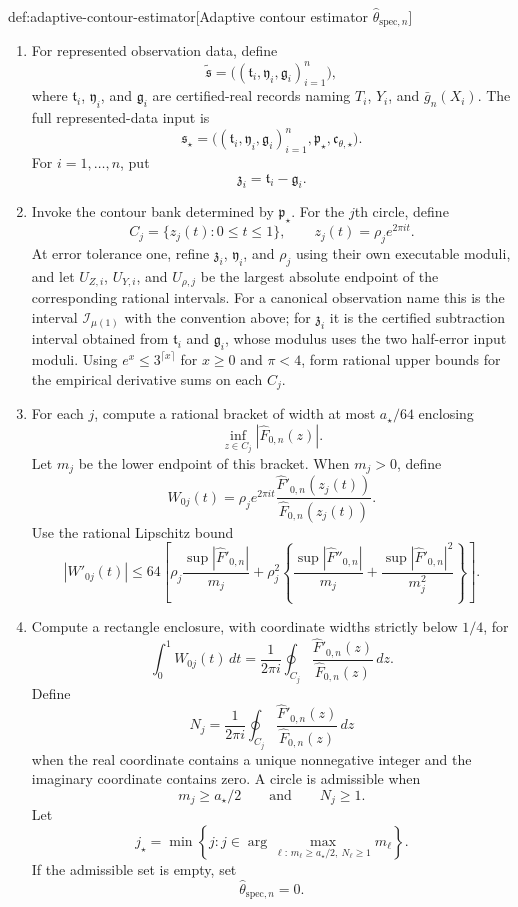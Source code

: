 \begin{algorithmv}{def:adaptive-contour-estimator}[Adaptive contour estimator \(\widehat\theta_{\mathrm{spec},n}\)]
\begin{enumerate}
\item For represented observation data, define
\[
\widetilde{\mathfrak s}
=
\bigl((\mathfrak t_i,\mathfrak y_i,\mathfrak g_i)_{i=1}^n\bigr),
\]
where \(\mathfrak t_i\), \(\mathfrak y_i\), and \(\mathfrak g_i\) are certified-real records naming \(T_i\), \(Y_i\), and \(\bar g_n(X_i)\). The full represented-data input is
\[
\mathfrak s_{\star}
=
\bigl((\mathfrak t_i,\mathfrak y_i,\mathfrak g_i)_{i=1}^n,
\mathfrak p_{\star},\mathfrak c_{\theta,\star}\bigr).
\]
For \(i=1,\ldots,n\), put
\[
\mathfrak z_i=\mathfrak t_i-\mathfrak g_i.
\]

\item Invoke the contour bank determined by \(\mathfrak p_{\star}\). For the \(j\)th circle, define
\[
C_j=\{z_j(t):0\le t\le1\},
\qquad
z_j(t)=\rho_je^{2\pi it}.
\]
At error tolerance one, refine \(\mathfrak z_i\), \(\mathfrak y_i\), and \(\mathfrak\rho_j\) using their own executable moduli, and let \(U_{Z,i}\), \(U_{Y,i}\), and \(U_{\rho,j}\) be the largest absolute endpoint of the corresponding rational intervals. For a canonical observation name this is the interval \(\mathcal I_{\mu(1)}\) with the convention above; for \(\mathfrak z_i\) it is the certified subtraction interval obtained from \(\mathfrak t_i\) and \(\mathfrak g_i\), whose modulus uses the two half-error input moduli. Using \(e^x\le3^{\lceil x\rceil}\) for \(x\ge0\) and \(\pi<4\), form rational upper bounds for the empirical derivative sums on each \(C_j\).

\item For each \(j\), compute a rational bracket of width at most \(a_{\star}/64\) enclosing
\[
\inf_{z\in C_j}|\widehat F_{0,n}(z)|.
\]
Let \(m_j\) be the lower endpoint of this bracket. When \(m_j>0\), define
\[
W_{0j}(t)=
\rho_je^{2\pi it}
\frac{\widehat F'_{0,n}(z_j(t))}
{\widehat F_{0,n}(z_j(t))}.
\]
Use the rational Lipschitz bound
\[
|W'_{0j}(t)|\le
64\left[
\rho_j\frac{\sup|\widehat F'_{0,n}|}{m_j}
+\rho_j^2\left\{
\frac{\sup|\widehat F''_{0,n}|}{m_j}
+\frac{\sup|\widehat F'_{0,n}|^2}{m_j^2}
\right\}\right].
\]

\item Compute a rectangle enclosure, with coordinate widths strictly below \(1/4\), for
\[
\int_0^1W_{0j}(t)\,dt
=
\frac{1}{2\pi i}\oint_{C_j}
\frac{\widehat F'_{0,n}(z)}
{\widehat F_{0,n}(z)}\,dz.
\]
Define
\[
N_j=
\frac{1}{2\pi i}\oint_{C_j}
\frac{\widehat F'_{0,n}(z)}
{\widehat F_{0,n}(z)}\,dz
\]
when the real coordinate contains a unique nonnegative integer and the imaginary coordinate contains zero. A circle is admissible when
\[
m_j\ge a_{\star}/2
\qquad\text{and}\qquad
N_j\ge1.
\]
Let
\[
j_{\star}
=
\min\left\{
j:
j\in\arg\max_{\ell:\,m_{\ell}\ge a_{\star}/2,\ N_{\ell}\ge1}m_{\ell}
\right\}.
\]
If the admissible set is empty, set
\[
\widehat\theta_{\mathrm{spec},n}=0.
\]


\end{enumerate}
\end{algorithmv}
